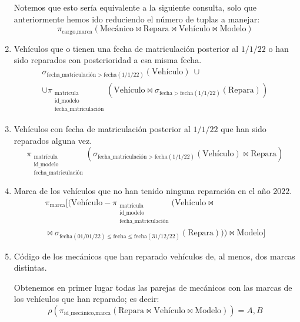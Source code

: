 \begin{ejercicio}
\begin{enumerate}
        Notemos que esto sería equivalente a la siguiente consulta, solo que anteriormente hemos ido reduciendo el número de tuplas a manejar:
        \begin{equation*}
            \pi_{\text{cargo},\text{marca}}(\text{Mecánico}\bowtie \text{Repara}\bowtie \text{Vehículo}\bowtie \text{Modelo})
        \end{equation*}
        \item Vehículos que o tienen una fecha de matriculación posterior al $1/1/22$ o han sido reparados con posterioridad a esa misma fecha.
        \begin{multline*}
            \sigma_{\text{fecha\_matriculación} > \text{fecha}(1/1/22)}(\text{Vehículo})~\cup\\ \cup \pi_{\substack{\text{matrícula}\\\text{id\_modelo}\\\text{fecha\_matriculación}}}(\text{Vehículo}\bowtie \sigma_{\text{fecha}>\text{fecha}(1/1/22)}(\text{Repara}))
        \end{multline*}
        \item Vehículos con fecha de matriculación posterior al $1/1/22$ que han sido reparados alguna vez.
        \begin{equation*}
            \pi_{\substack{\text{matrícula}\\\text{id\_modelo}\\\text{fecha\_matriculación}}}(\sigma_{\text{fecha\_matriculación} > \text{fecha}(1/1/22)}(\text{Vehículo})\bowtie \text{Repara})
        \end{equation*}
        \item Marca de los vehículos que no han tenido ninguna reparación en el año $2022$.
        \begin{multline*}
            \pi_{\text{marca}}[(\text{Vehículo} - \pi_{\substack{\text{matrícula}\\\text{id\_modelo}\\\text{fecha\_matriculación}}}(\text{Vehículo} \bowtie\\\bowtie \sigma_{\text{fecha}(01/01/22) \leq \text{fecha}\leq \text{fecha}(31/12/22)}(\text{Repara})))\bowtie \text{Modelo}]
        \end{multline*}
        \item Código de los mecánicos que han reparado vehículos de, al menos, dos marcas distintas.
        
        Obtenemos en primer lugar todas las parejas de mecánicos con las marcas de los vehículos que han reparado; es decir:
        \begin{equation*}
            \rho\left(\pi_{\text{id\_mecánico},\text{marca}}(\text{Repara}\bowtie \text{Vehículo}\bowtie \text{Modelo})\right) = A,B
        \end{equation*}


\end{enumerate}
\end{ejercicio}
